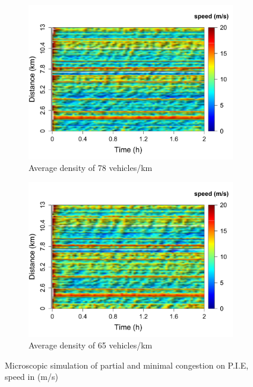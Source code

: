 \documentclass[procedia]{easychair}
\begin{document}
   
   \begin{figure}[!htbp]
      \begin{subfigure}[c]{.47\textwidth}
      \centering
       \includegraphics[clip=true,trim=0cm 0cm 0cm 1.5cm,scale=0.36]{graphs/Simulated/Partial-Congestion}
       \caption{Average density of 78 vehicles/km}
       \label{fig:partially-congested-traffic}
      \end{subfigure}
       \hspace*{\fill}
      \begin{subfigure}[c]{.47\textwidth}
       \centering
        \includegraphics[clip=true,trim=0cm 0cm 0cm 1.5cm,scale=0.36]{graphs/Simulated/Medium-Traffic}
        \caption{Average density of 65 vehicles/km}
        \label{fig:medium-traffic}
       \end{subfigure} 
      \caption{Microscopic simulation of partial and minimal congestion on P.I.E, speed in (m/s)}
      \end{figure}
     
\end{document}
